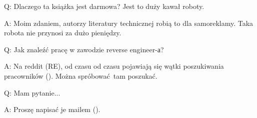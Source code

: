 \par Q: Dlaczego ta książka jest darmowa? Jest to duży kawał roboty.
\par A: Moim zdaniem, autorzy literatury technicznej robią to dla samoreklamy. Taka robota nie przynosi za dużo pieniędzy.

\par Q: Jak znaleźć pracę w zawodzie reverse engineer-а?
\par A: Na reddit (RE\FNURLREDDIT), od czasu od czasu pojawiają się wątki poszukiwania pracowników (\RedditHiringThread{}).
Można spróbować tam poszukać.


\par Q: Mam pytanie...
\par A: Proszę napisać je mailem (\EMAIL).


